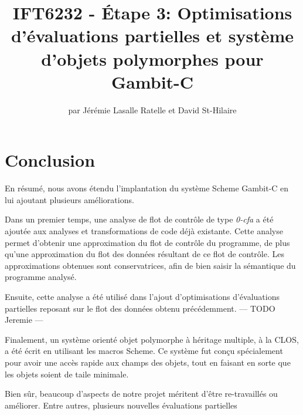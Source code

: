 \documentclass[letterpaper,12pt]{book}
\begin{document}
\title{IFT6232 - Étape 3: Optimisations d'évaluations partielles et
  système d'objets polymorphes pour Gambit-C}

\author{par Jérémie Lasalle Ratelle et David St-Hilaire}
\maketitle


\tableofcontents







\chapter{Conclusion}
  
  En résumé, nous avons étendu l'implantation du système Scheme
  Gambit-C en lui ajoutant plusieurs améliorations. 

  Dans un premier temps, une analyse de flot de contrôle de type
  \textit{0-cfa} a été ajoutée aux analyses et transformations de code
  déjà existante. Cette analyse permet d'obtenir une approximation du
  flot de contrôle du programme, de plus qu'une approximation du flot
  des données résultant de ce flot de contrôle. Les approximations
  obtenues sont conservatrices, afin de bien saisir la sémantique du
  programme analysé.

  Ensuite, cette analyse a été utilisé dans l'ajout d'optimisations
  d'évaluations partielles reposant sur le flot des données obtenu
  précédemment. --- TODO Jeremie ---

  Finalement, un système orienté objet polymorphe à héritage multiple,
  à la CLOS, a été écrit en utilisant les macros Scheme. Ce système
  fut conçu spécialement pour avoir une accès rapide aux champs des
  objets, tout en faisant en sorte que les objets soient de taile
  minimale. 

  Bien sûr, beaucoup d'aspects de notre projet méritent d'être
  re-travaillés ou améliorer. Entre autres, plusieurs nouvelles
  évaluations partielles





\end{document}
